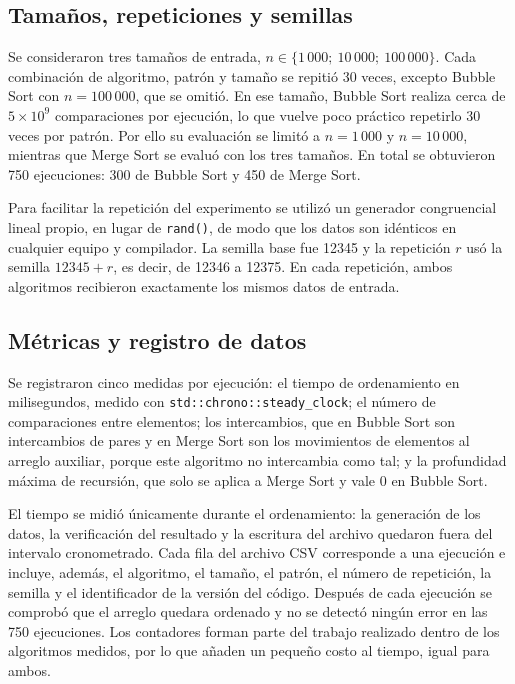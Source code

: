 \documentclass[12pt,a4paper,twocolumn]{article}
\begin{document}
\subsection{Tamaños, repeticiones y semillas}
 
Se consideraron tres tamaños de entrada,
$n \in \{1\,000;\ 10\,000;\ 100\,000\}$. Cada combinación de
algoritmo, patrón y tamaño se repitió 30 veces, excepto Bubble Sort
con $n = 100\,000$, que se omitió. En ese tamaño, Bubble Sort realiza
cerca de $5\times10^{9}$ comparaciones por ejecución, lo que vuelve
poco práctico repetirlo 30 veces por patrón. Por ello su evaluación
se limitó a $n = 1\,000$ y $n = 10\,000$, mientras que Merge Sort se
evaluó con los tres tamaños. En total se obtuvieron 750 ejecuciones:
300 de Bubble Sort y 450 de Merge Sort.
 
Para facilitar la repetición del experimento se utilizó un generador
congruencial lineal propio, en lugar de \texttt{rand()}, de modo que
los datos son idénticos en cualquier equipo y compilador. La semilla
base fue 12345 y la repetición $r$ usó la semilla $12345 + r$, es
decir, de 12346 a 12375. En cada repetición, ambos algoritmos
recibieron exactamente los mismos datos de entrada.
 
\subsection{Métricas y registro de datos}
 
Se registraron cinco medidas por ejecución: el tiempo de ordenamiento
en milisegundos, medido con \texttt{std::chrono::steady\_clock}; el
número de comparaciones entre elementos; los intercambios, que en
Bubble Sort son intercambios de pares y en Merge Sort son los movimientos
de elementos al arreglo auxiliar, porque este algoritmo no intercambia
como tal; y la profundidad máxima de recursión, que solo se aplica a
Merge Sort y vale 0 en Bubble Sort.
 
El tiempo se midió únicamente durante el ordenamiento: la generación
de los datos, la verificación del resultado y la escritura del archivo
quedaron fuera del intervalo cronometrado. Cada fila del archivo CSV
corresponde a una ejecución e incluye, además, el algoritmo, el
tamaño, el patrón, el número de repetición, la semilla y el
identificador de la versión del código. Después de cada ejecución se
comprobó que el arreglo quedara ordenado y no se detectó ningún error en
las 750 ejecuciones. Los contadores forman parte del trabajo realizado
dentro de los algoritmos medidos, por lo que añaden un pequeño costo al
tiempo, igual para ambos.
 
\end{document}
